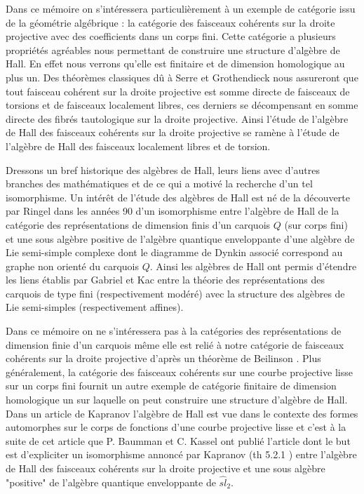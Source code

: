 \documentclass[12pt]{article}
\theoremstyle{definition}
\begin{document}
Dans ce mémoire on s'intéressera particulièrement à un exemple de catégorie issu de la géométrie algébrique : la catégorie des faisceaux cohérents sur la droite projective avec des coefficients dans un corps fini. Cette catégorie a plusieurs propriétés agréables nous permettant de construire une structure d'algèbre de Hall. En effet nous verrons qu'elle est finitaire et de dimension homologique au plus un. Des théorèmes classiques dû à Serre et Grothendieck nous assureront que tout faisceau cohérent sur la droite projective est somme directe de faisceaux de torsions et de faisceaux localement libres, ces derniers se décompensant en somme directe des fibrés tautologique sur la droite projective. Ainsi l'étude de l'algèbre de Hall des faisceaux cohérents sur la droite projective se ramène à l'étude de l'algèbre de Hall des faisceaux localement libres et de torsion.\vspace{0.5cm}

Dressons un bref historique des algèbres de Hall, leurs liens avec d'autres branches des mathématiques et de ce qui a motivé la recherche d'un tel isomorphisme. Un intérêt de l'étude des algèbres de Hall est né de la découverte par Ringel dans les années 90 d'un isomorphisme entre l'algèbre de Hall de la catégorie des représentations de dimension finis d'un carquois $Q$ (sur corps fini) et une sous algèbre positive de l'algèbre quantique  enveloppante d'une algèbre de Lie semi-simple complexe dont le diagramme de Dynkin associé correspond au graphe non orienté du carquois $Q$. Ainsi les algèbres de Hall ont permis d'étendre les liens établis par Gabriel et Kac entre la théorie des représentations des carquois de type fini (respectivement modéré) avec la structure des algèbres de Lie semi-simples (respectivement affines). \vspace{0.5cm}

Dans ce mémoire on ne s'intéressera pas à la catégories des représentations de dimension finie d'un carquois même elle est relié à notre catégorie de faisceaux cohérents sur la droite projective d'après un théorème de Beilinson \cite{Beil}. Plus généralement, la catégorie des faisceaux cohérents sur une courbe projective lisse sur un corps fini fournit un autre exemple de catégorie finitaire de dimension homologique un sur laquelle on peut construire une structure d'algèbre de Hall. Dans un article de Kapranov \cite{Kapranov} l'algèbre de Hall est vue dans le contexte des formes automorphes sur le corps de fonctions d'une courbe projective lisse et c'est à la suite de cet article que P. Baumman et C. Kassel ont publié l'article \cite{Baum} dont le but est d'expliciter un isomorphisme annoncé par Kapranov (th 5.2.1 \cite{Kapranov}) entre l'algèbre de Hall des faisceaux cohérents sur la droite projective et une sous algèbre "positive" de l'algèbre quantique enveloppante de $\widehat{sl}_2$.\vspace{0.5cm}
\end{document}
